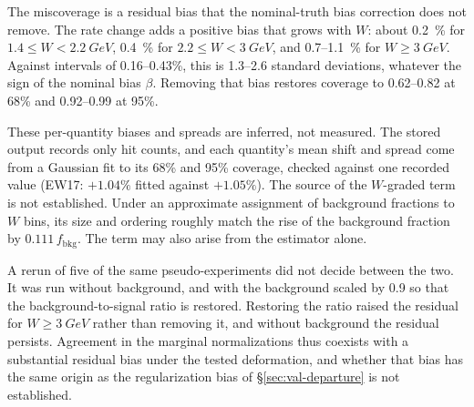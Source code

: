 The miscoverage is a residual bias that the nominal-truth bias correction does not remove.  The rate change adds a positive bias that grows with $W$: about \SI{0.2}{\percent} for $1.4\le W<\SI{2.2}{GeV}$, \SI{0.4}{\percent} for $2.2\le W<\SI{3}{GeV}$, and 0.7--\SI{1.1}{\percent} for $W\ge\SI{3}{GeV}$. Against intervals of 0.16--0.43\%, this is 1.3--2.6 standard deviations, whatever the sign of the nominal bias $\beta$. Removing that bias restores coverage to 0.62--0.82 at 68\% and 0.92--0.99 at 95\%.

These per-quantity biases and spreads are inferred, not measured. The stored output records only hit counts, and each quantity's mean shift and spread come from a Gaussian fit to its 68\% and 95\% coverage, checked against one recorded value (EW17: $+1.04\%$ fitted against $+1.05\%$).  The source of the $W$-graded term is not established. Under an approximate assignment of background fractions to $W$ bins, its size and ordering roughly match the rise of the background fraction by $0.111\,f_{\mathrm{bkg}}$. The term may also arise from the estimator alone.

A rerun of five of the same pseudo-experiments did not decide between the two. It was run without background, and with the background scaled by 0.9 so that the background-to-signal ratio is restored. Restoring the ratio raised the residual for $W\ge\SI{3}{GeV}$ rather than removing it, and without background the residual persists. Agreement in the marginal normalizations thus coexists with a substantial residual bias under the tested deformation, and whether that bias has the same origin as the regularization bias of \S\ref{sec:val-departure} is not established.

